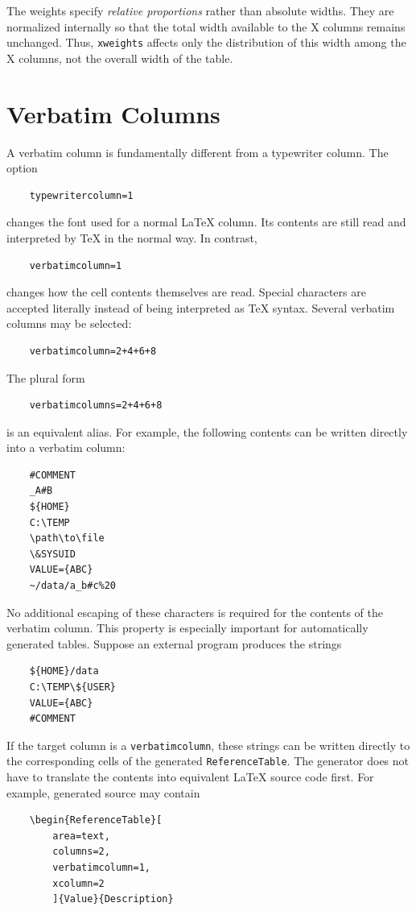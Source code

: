 \documentclass[
11pt,
a4paper,
oneside
]{scrbook}
\begin{document}
{The weights specify \emph{relative proportions} rather than absolute widths.
They are normalized internally so that the total width available to the
X columns remains unchanged. Thus, \texttt{xweights} affects only the
distribution of this width among the X columns, not the overall width of
the table.

\section{Verbatim Columns}

A verbatim column is fundamentally different from a typewriter column.
The option
\begin{verbatim}
	typewritercolumn=1
\end{verbatim}
changes the font used for a normal \LaTeX{} column. Its contents are still
read and interpreted by \TeX{} in the normal way.
In contrast,
\begin{verbatim}
	verbatimcolumn=1
\end{verbatim}
changes how the cell contents themselves are read. Special characters are
accepted literally instead of being interpreted as \TeX{} syntax.
Several verbatim columns may be selected:
\begin{verbatim}
	verbatimcolumn=2+4+6+8
\end{verbatim}
The plural form
\begin{verbatim}
	verbatimcolumns=2+4+6+8
\end{verbatim}
is an equivalent alias.
For example, the following contents can be written directly into a verbatim
column:
\begin{verbatim}
	#COMMENT
	_A#B
	${HOME}
	C:\TEMP
	\path\to\file
	\&SYSUID
	VALUE={ABC}
	~/data/a_b#c%20
\end{verbatim}
No additional escaping of these characters is required for the contents of
the verbatim column.
This property is especially important for automatically generated tables.
Suppose an external program produces the strings
\begin{verbatim}
	${HOME}/data
	C:\TEMP\${USER}
	VALUE={ABC}
	#COMMENT
\end{verbatim}
If the target column is a \texttt{verbatimcolumn}, these strings can be
written directly to the corresponding cells of the generated
\texttt{ReferenceTable}. The generator does not have to translate the
contents into equivalent \LaTeX{} source code first.
For example, generated source may contain
\begin{verbatim}
	\begin{ReferenceTable}[
		area=text,
		columns=2,
		verbatimcolumn=1,
		xcolumn=2
		]{Value}{Description}
		

\end{verbatim}}
\end{document}
